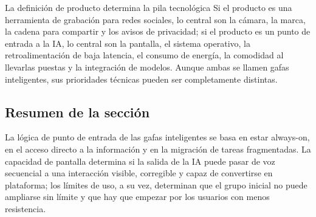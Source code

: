 \begin{importantbox}{La definición de producto determina la pila tecnológica}
Si el producto es una herramienta de grabación para redes sociales, lo central son la cámara, la marca, la cadena para compartir y los avisos de privacidad; si el producto es un punto de entrada a la IA, lo central son la pantalla, el sistema operativo, la retroalimentación de baja latencia, el consumo de energía, la comodidad al llevarlas puestas y la integración de modelos. Aunque ambas se llamen gafas inteligentes, sus prioridades técnicas pueden ser completamente distintas.
\end{importantbox}

\subsection{Resumen de la sección}

La lógica de punto de entrada de las gafas inteligentes se basa en estar always-on, en el acceso directo a la información y en la migración de tareas fragmentadas. La capacidad de pantalla determina si la salida de la IA puede pasar de voz secuencial a una interacción visible, corregible y capaz de convertirse en plataforma; los límites de uso, a su vez, determinan que el grupo inicial no puede ampliarse sin límite y que hay que empezar por los usuarios con menos resistencia.
